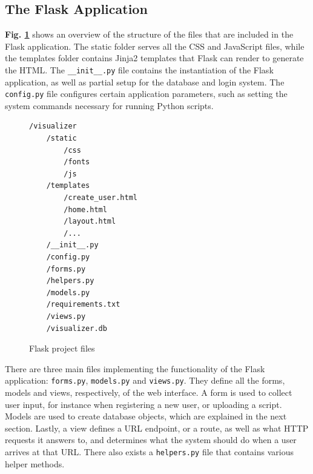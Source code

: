 
\subsection{The Flask Application}

\textbf{Fig. \ref{struct}} shows an overview of the structure of the files that are included in the Flask application. The static folder serves all the CSS and JavaScript files, while the templates folder contains Jinja2 templates that Flask can render to generate the HTML. The \texttt{\_\_init\_\_.py} file contains the instantiation of the Flask application, as well as partial setup for the database and login system. The \texttt{config.py} file configures certain application parameters, such as setting the system commands necessary for running Python scripts.\\

\begin{figure}[h!]
\begin{verbatim}
/visualizer
    /static
        /css
        /fonts
        /js
    /templates
        /create_user.html
        /home.html
        /layout.html
        /...
    /__init__.py
    /config.py
    /forms.py
    /helpers.py
    /models.py
    /requirements.txt
    /views.py
    /visualizer.db
\end{verbatim}
\caption{Flask project files}
\label{struct}
\end{figure}

\noindent There are three main files implementing the functionality of the Flask application: \texttt{forms.py}, \texttt{models.py} and \texttt{views.py}. They define all the forms, models and views, respectively, of the web interface. A form is used to collect user input, for instance when registering a new user, or uploading a script. Models are used to create database objects, which are explained in the next section. Lastly, a view defines a URL endpoint, or a route, as well as what HTTP requests it answers to, and determines what the system should do when a user arrives at that URL. There also exists a \texttt{helpers.py} file that contains various helper methods. \\

